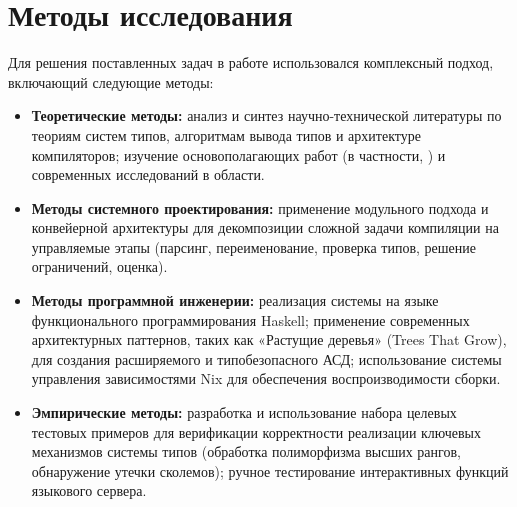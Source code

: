 \section*{Методы исследования}
Для решения поставленных задач в работе использовался комплексный подход, включающий следующие методы:
\begin{itemize}
    \item \textbf{Теоретические методы:} анализ и синтез научно-технической литературы по теориям систем типов, алгоритмам вывода типов и архитектуре компиляторов; изучение основополагающих работ (в частности, \cite{jones-practical-2007}) и современных исследований в области.
    \item \textbf{Методы системного проектирования:} применение модульного подхода и конвейерной архитектуры для декомпозиции сложной задачи компиляции на управляемые этапы (парсинг, переименование, проверка типов, решение ограничений, оценка).
    \item \textbf{Методы программной инженерии:} реализация системы на языке функционального программирования Haskell; применение современных архитектурных паттернов, таких как «Растущие деревья» (Trees That Grow), для создания расширяемого и типобезопасного АСД; использование системы управления зависимостями Nix для обеспечения воспроизводимости сборки.
    \item \textbf{Эмпирические методы:} разработка и использование набора целевых тестовых примеров для верификации корректности реализации ключевых механизмов системы типов (обработка полиморфизма высших рангов, обнаружение утечки сколемов); ручное тестирование интерактивных функций языкового сервера.
\end{itemize}

